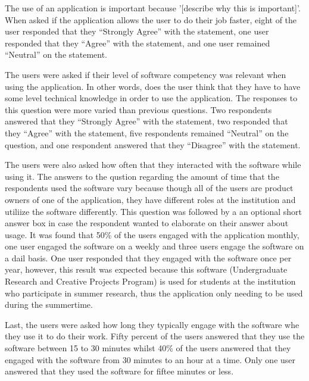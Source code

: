 The use of an application is important because '[describe why this is important]'. When asked if the application allows the user to do their job faster, eight of the user responded that they ``Strongly Agree'' with the statement, one user responded that they ``Agree'' with the statement, and one user remained ``Neutral'' on the statement.

The users were asked if their level of software competency was relevant when using the application. In other words, does the user think that they have to have some level technical knowledge in order to use the application. The responses to this question were more varied than previous questions. Two respondents answered that they ``Strongly Agree'' with the statement,  two responded that they ``Agree'' with the statement, five respondents remained ``Neutral'' on the question, and one respondent answered that they ``Disagree'' with the statement.

The users were also asked how often that they interacted with the software while using it. The answers to the qustion regarding the amount of time that the respondents used the software vary because though all of the users are product owners of one of the application, they have different roles at the institution and utiliize the software differently. This question was followed by a an optional short answer box in case the respondent wanted to elaborate on their answer about usage. It was found that 50\% of the users engaged with the application monthly, one user engaged the software on a weekly and three users engage the software on a dail basis. One user responded that they engaged with the software once per year, however, this result was expected because this software (Undergraduate Research and Creative Projects Program) is used for students at the institution who participate in summer research, thus the application only needing to be used during the summertime.

Last, the users were asked how long they typically engage with the software whe they use it to do their work. Fifty percent of the users answered that they use the software between 15 to 30 minutes whilst 40\% of the users answered that they engaged with the software from 30 minutes to an hour at a time. Only one user answered that they used the software for fiftee minutes or less.


